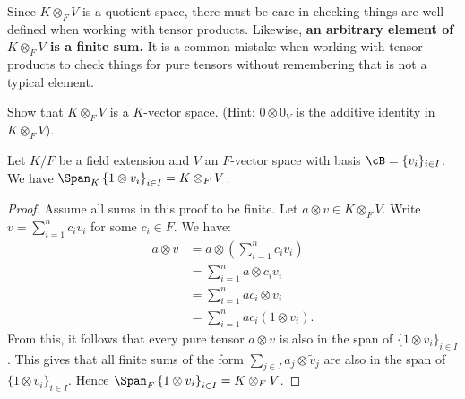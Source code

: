     \begin{note}
        Since $K \otimes_F V$ is a quotient space, there must be care in checking things are well-defined when working with tensor products. Likewise, \textbf{an arbitrary element of $K \otimes_F V$ is a finite sum.} It is a common mistake when working with tensor products to check things for pure tensors without remembering that is not a typical element.
    \end{note}

    \begin{exercise}
        Show that $K \otimes_F V$ is a $K$-vector space. (Hint: $0 \otimes 0_V$ is the additive identity in $K \otimes_F V$).
    \end{exercise}

    \begin{proposition}\label{prop:basis-of-tensor}
        Let $K/F$ be a field extension and $V$ an $F$-vector space with basis $\cB = \{v_i\}_{i \in I}$. We have $\Span_K \left\{1 \otimes v_i\right\}_{i \in I} = K \otimes_F V$.
    \end{proposition}
        \begin{proof}
            Assume all sums in this proof to be finite. Let $a \otimes v \in K\otimes_F V$. Write $v = \sum_{i=1}^n c_i v_i$ for some $c_i \in F$. We have:
                \begin{equation*}
                \begin{split}
                    a \otimes v 
                    & = a \otimes \left(\sum_{i=1}^n c_i v_i\right) \\
                    & = \sum_{i = 1}^n a \otimes c_i v_i \\
                    & = \sum_{i = 1}^n ac_i \otimes v_i \\
                    & = \sum_{i = 1}^n ac_i(1 \otimes v_i).
                \end{split}
                \end{equation*}
            From this, it follows that every pure tensor $a \otimes v$ is also in the span of $\{1 \otimes v_i\}_{i \in I}$. This gives that all finite sums of the form $\sum_{j \in I}a_j \otimes \tilde{v}_j$ are also in the span of $\{1 \otimes v_i\}_{i \in I}$. Hence $\Span_F \left\{1 \otimes v_i\right\}_{i \in I} = K \otimes_F V$.
        \end{proof}

